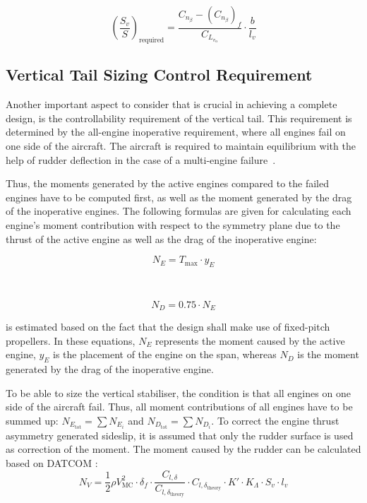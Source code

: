 \begin{equation}
    \label{eq:Tail_area_stability}
    \left(\frac{S_v}{S}\right)_\text{required} =\frac{C_{n_\beta}-\left(C_{n_\beta}\right)_{f}}{C_{L_{v_\alpha}}} \cdot \frac{b}{l_v}
\end{equation}



\subsection{Vertical Tail Sizing Control Requirement}
\label{subsec:Vertical_Tail_Sizing_Control_Requirement}
Another important aspect to consider that is crucial in achieving a complete design, is the controllability requirement of the vertical tail.
This requirement is determined by the all-engine inoperative requirement, where all engines fail on one side of the aircraft.
The aircraft is required to maintain equilibrium with the help of rudder deflection in the case of a multi-engine failure~\cite{easa_cs23_2020}.

Thus, the moments generated by the active engines compared to the failed engines have to be computed first, as well as the moment generated by the drag of the inoperative engines.
The following formulas are given for calculating each engine’s moment contribution with respect to the symmetry plane due to the thrust of the active engine as well as the drag of the inoperative engine:

\begin{minipage}{0.45\textwidth}
    \begin{equation}
    N_E=T_{\max} \cdot y_E
\end{equation}
\end{minipage}
~
\begin{minipage}{0.45\textwidth}
   \begin{equation}
    \label{eq:N_D}
    N_D=0.75\cdot N_E
\end{equation} 
\end{minipage}

 is estimated based on the fact that the design shall make use of fixed-pitch propellers.
In these equations, $N_E$ represents the moment caused by the active engine, $y_E$ is the placement of the engine on the span, whereas $N_D$ is the moment generated by the drag of the inoperative engine.

To be able to size the vertical stabiliser, the condition is that all engines on one side of the aircraft fail.
Thus, all moment contributions of all engines have to be summed up: $N_{E_\text{tot}}=\sum N_{E_{i}}$ and $N_{D_\text{tot}}=\sum N_{D_{i}}$.
To correct the engine thrust asymmetry generated sideslip, it is assumed that only the rudder surface is used as correction of the moment.
The moment caused by the rudder can be calculated based on DATCOM \cite{DATCOM}:
\begin{equation}
    N_V=\frac{1}{2}\rho V_\text{MC}^2\cdot \delta_f \cdot \frac{C_{l,\delta}}{C_{l,\delta_\text{theory}}} \cdot C_{l,\delta_\text{theory}} \cdot K' \cdot K_{\Lambda} \cdot S_v \cdot l_v
\end{equation}

